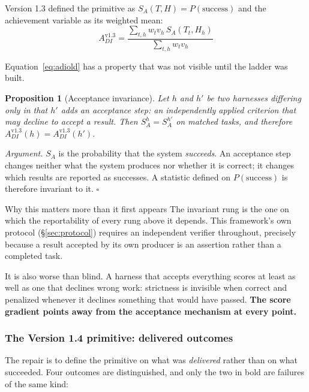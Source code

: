 \documentclass[11pt]{article}
\newtheorem{proposition}{Proposition}
\theoremstyle{definition}
\newcommand{\SA}{\ensuremath{S_A(T,H)}}
\begin{document}
Version 1.3 defined the primitive as $\SA{} = P(\text{success})$ and the achievement variable as its weighted mean:
\begin{equation}
A_{DI}^{\text{v1.3}} = \frac{\sum_{t,h} w_t v_h\, S_A(T_t,H_h)}{\sum_{t,h} w_t v_h}
\label{eq:adiold}
\end{equation}

Equation~\eqref{eq:adiold} has a property that was not visible until the ladder was built.

\begin{proposition}[Acceptance invariance]\label{prop:blind}
Let $h$ and $h'$ be two harnesses differing only in that $h'$ adds an acceptance step: an independently applied criterion that may decline to accept a result. Then $S_A^{h} = S_A^{h'}$ on matched tasks, and therefore $A_{DI}^{\text{v1.3}}(h) = A_{DI}^{\text{v1.3}}(h')$.
\end{proposition}

\emph{Argument.} $S_A$ is the probability that the system \emph{succeeds}. An acceptance step changes neither what the system produces nor whether it is correct; it changes which results are reported as successes. A statistic defined on $P(\text{success})$ is therefore invariant to it. \hfill$\square$

\begin{cautionbox}{Why this matters more than it first appears}
The invariant rung is the one on which the reportability of every rung above it depends. This framework's own protocol (\S\ref{sec:protocol}) requires an independent verifier throughout, precisely because a result accepted by its own producer is an assertion rather than a completed task.

It is also worse than blind. A harness that accepts everything scores at least as well as one that declines wrong work: strictness is invisible when correct and penalized whenever it declines something that would have passed. \textbf{The score gradient points away from the acceptance mechanism at every point.}
\end{cautionbox}

\subsubsection{The Version 1.4 primitive: delivered outcomes}

The repair is to define the primitive on what was \emph{delivered} rather than on what succeeded. Four outcomes are distinguished, and only the two in bold are failures of the same kind:
\end{document}
